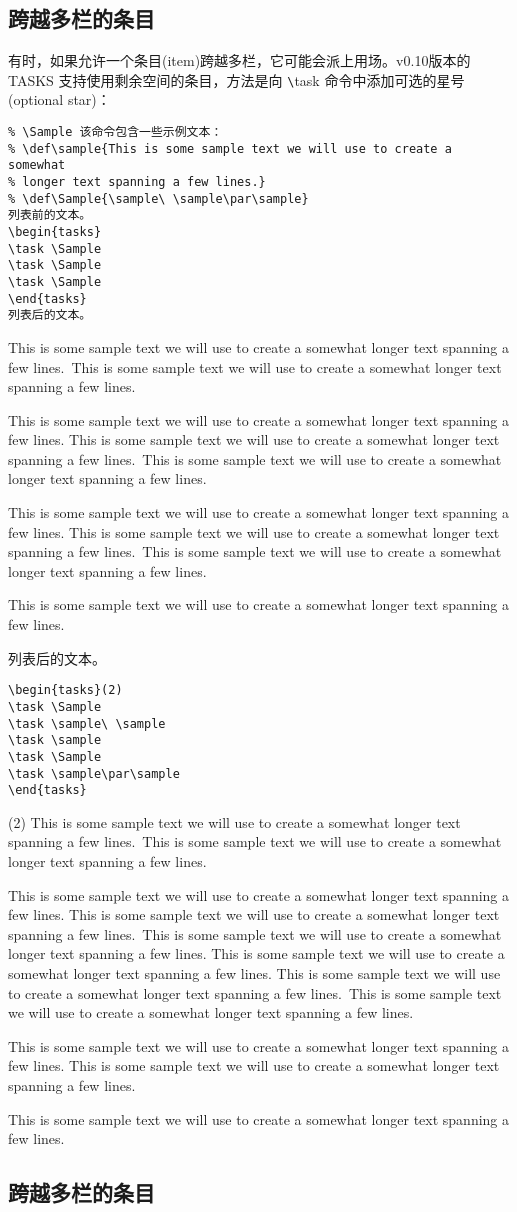 \documentclass[a4paper,12pt,indent]{article}
\begin{document}
\subsection{跨越多栏的条目}

有时，如果允许一个条目(item)跨越多栏，它可能会派上用场。v0.10版本的 \textcolor{Tasks}{TASKS} 支持使用剩余空间的条目，方法是向 \verb|\|\textcolor{Tasks}{task} 命令中添加可选的星号(optional star)：


\def\sample{This is some sample text we will use to create a somewhat
longer text spanning a few lines.}
\def\Sample{\sample\ \sample\par\sample}
\begin{tcolorbox}[collower=black,colframe=Tasks,colback=white]
\begin{lstlisting}
% \Sample 该命令包含一些示例文本：
% \def\sample{This is some sample text we will use to create a somewhat
% longer text spanning a few lines.}
% \def\Sample{\sample\ \sample\par\sample}
列表前的文本。
\begin{tasks}
\task \Sample
\task \Sample
\task \Sample
\end{tasks}
列表后的文本。
\end{lstlisting}
\tcblower
\begin{tasks}
\task \Sample
\task \Sample
\task \Sample
\end{tasks}
列表后的文本。
\end{tcolorbox}

\begin{tcolorbox}[collower=black,colframe=Tasks,colback=white]
    \begin{lstlisting}
\begin{tasks}(2)
\task \Sample
\task \sample\ \sample
\task \sample
\task \Sample
\task \sample\par\sample
\end{tasks}
    \end{lstlisting}
    \tcblower
    \begin{tasks}(2)
        \task \Sample
        \task \sample\ \sample
        \task \sample
        \task \Sample
        \task \sample\par\sample
        \end{tasks}
    \end{tcolorbox}


\subsection{跨越多栏的条目}
\end{document}
